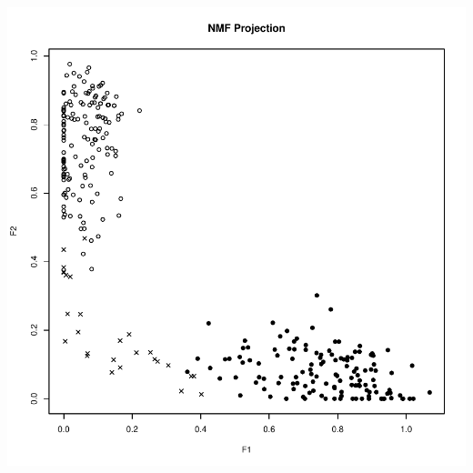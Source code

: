 \documentclass{article}\usepackage[]{graphicx}\usepackage[]{color}
\makeatletter
\def\maxwidth{ %
  \ifdim\Gin@nat@width>\linewidth
    \linewidth
  \else
    \Gin@nat@width
  \fi
}
\newenvironment{knitrout}{}{} %
\makeatother
\begin{document}
\begin{knitrout}
{\centering \includegraphics[width=\maxwidth]{figure/plots-8} 

}



\end{knitrout}
\end{document}
